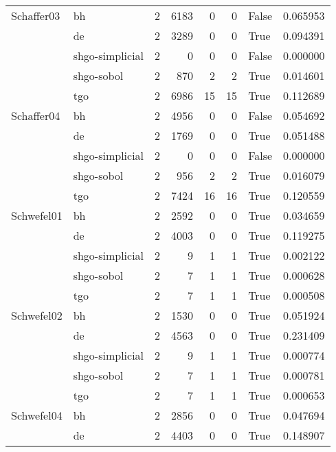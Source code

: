\begin{longtable}{llrrrrlr}
Schaffer03 & bh &     2 &     6183 &      0 &       0 &   False &    0.065953 \\
         & de &     2 &     3289 &      0 &       0 &    True &    0.094391 \\
         & shgo-simplicial &     2 &        0 &      0 &       0 &   False &    0.000000 \\
         & shgo-sobol &     2 &      870 &      2 &       2 &    True &    0.014601 \\
         & tgo &     2 &     6986 &     15 &      15 &    True &    0.112689 \\
Schaffer04 & bh &     2 &     4956 &      0 &       0 &   False &    0.054692 \\
         & de &     2 &     1769 &      0 &       0 &    True &    0.051488 \\
         & shgo-simplicial &     2 &        0 &      0 &       0 &   False &    0.000000 \\
         & shgo-sobol &     2 &      956 &      2 &       2 &    True &    0.016079 \\
         & tgo &     2 &     7424 &     16 &      16 &    True &    0.120559 \\
Schwefel01 & bh &     2 &     2592 &      0 &       0 &    True &    0.034659 \\
         & de &     2 &     4003 &      0 &       0 &    True &    0.119275 \\
         & shgo-simplicial &     2 &        9 &      1 &       1 &    True &    0.002122 \\
         & shgo-sobol &     2 &        7 &      1 &       1 &    True &    0.000628 \\
         & tgo &     2 &        7 &      1 &       1 &    True &    0.000508 \\
Schwefel02 & bh &     2 &     1530 &      0 &       0 &    True &    0.051924 \\
         & de &     2 &     4563 &      0 &       0 &    True &    0.231409 \\
         & shgo-simplicial &     2 &        9 &      1 &       1 &    True &    0.000774 \\
         & shgo-sobol &     2 &        7 &      1 &       1 &    True &    0.000781 \\
         & tgo &     2 &        7 &      1 &       1 &    True &    0.000653 \\
Schwefel04 & bh &     2 &     2856 &      0 &       0 &    True &    0.047694 \\
         & de &     2 &     4403 &      0 &       0 &    True &    0.148907 \\

\end{longtable}
